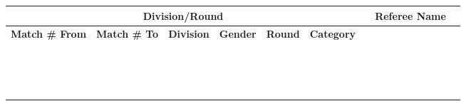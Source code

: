 \documentclass[letterpaper,12pt]{article}
\begin{document}
	
	
	\centering
	\footnotesize %
	\begin{tabular}{|p{1.5cm}|p{1.5cm}|p{1.4cm}|p{1.4cm}|p{1.4cm}|p{1.5cm}|
			p{1.1cm}|p{1.1cm}|p{1.1cm}|p{1.1cm}|p{1.1cm}|p{1.1cm}|p{1.1cm}|p{1.1cm}|p{1.1cm}|p{1.1cm}|}
		\hline
		\multicolumn{6}{|c|}{\textbf{Division/Round}} & \multicolumn{10}{c|}{\textbf{Referee Name}} \\
		\hline
		\centering\textbf{Match \# From} & \centering\textbf{Match \# To} & \centering\textbf{Division} & \centering\textbf{Gender} & \centering\textbf{Round} & \centering\textbf{Category} & & & & & & & & & & \\
		\hline
		& & & & & & & & & & & & & & & \\
		\hline
		& & & & & & & & & & & & & & & \\
		\hline
		& & & & & & & & & & & & & & & \\
		\hline
		& & & & & & & & & & & & & & & \\
		\hline
		& & & & & & & & & & & & & & & \\
		\hline
		& & & & & & & & & & & & & & & \\
		\hline
		& & & & & & & & & & & & & & & \\
		\hline
		& & & & & & & & & & & & & & & \\
		\hline
		& & & & & & & & & & & & & & & \\
		\hline
		& & & & & & & & & & & & & & & \\
		\hline
		& & & & & & & & & & & & & & & \\
		\hline
		& & & & & & & & & & & & & & & \\
		\hline
		& & & & & & & & & & & & & & & \\
		\hline
		& & & & & & & & & & & & & & & \\
		\hline
		& & & & & & & & & & & & & & & \\
		\hline
	\end{tabular}
	
\end{document}
